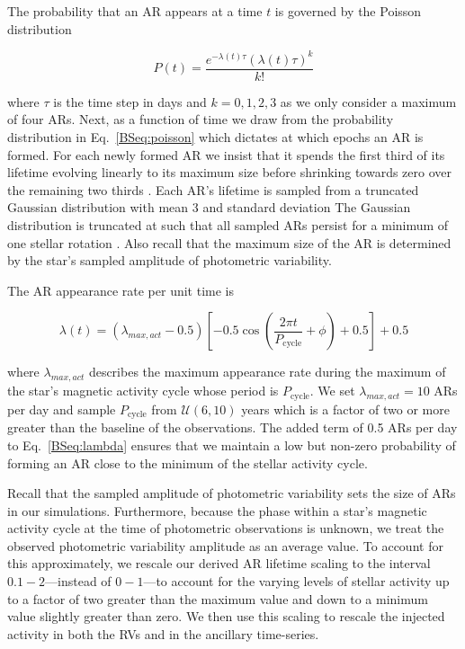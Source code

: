 The probability that an AR appears at a time $t$ is governed by the Poisson distribution

\begin{equation}
  P(t) = \frac{e^{-\lambda(t) \tau} (\lambda(t) \tau)^k}{k!} \label{BSeq:poisson}
\end{equation}

\noindent where $\tau$ is the time step in days and $k=0,1,2,3$ as we only consider a maximum of
four ARs. Next, as a function of time we draw from the probability distribution in Eq.~\ref{BSeq:poisson} 
which dictates at which epochs an AR is formed. For each newly formed AR 
we insist that it spends the first third of its lifetime evolving linearly to its maximum size before
shrinking towards zero over the remaining two thirds \citep{dumusque16a}.
Each AR's lifetime is sampled from a truncated Gaussian distribution with mean 3\prot{} and standard
deviation  The Gaussian distribution is truncated at \prot{} such that all sampled ARs persist
for a minimum of one stellar rotation \citep[e.g.][]{bonfils07,forveille09,hebrard16}.
Also recall that the maximum size of the AR is determined by the star's sampled amplitude of photometric
variability.

The AR appearance rate per unit time is

\begin{equation}
  \lambda(t) = (\lambda_{max,act} - 0.5) \left[ -0.5 \cos{\left( \frac{2\pi t}{P_{\text{cycle}}} + \phi \right)} + 0.5 \right] + 0.5
\label{BSeq:lambda}
\end{equation}

\noindent where $\lambda_{max,act}$ describes the maximum appearance rate during the maximum of the star's
magnetic activity cycle whose period is $P_{\text{cycle}}$. We set $\lambda_{max,act}=10$ ARs per day and sample
$P_{\text{cycle}}$ from $\mathcal{U}(6,10)$ years \citep{mascareno16, wargelin17} which is a factor of two or more
greater than the baseline of the observations. The added term of 0.5 ARs per day
to Eq.~\ref{BSeq:lambda} ensures that we maintain a low but non-zero probability of forming an AR close to the
minimum of the stellar activity cycle.

Recall that the sampled amplitude of photometric variability sets the size of ARs in our simulations.
Furthermore, because the phase within a star's magnetic activity cycle at the time of photometric observations
is unknown, we treat the observed photometric variability amplitude as an average value. To account for this
approximately, we rescale our
derived AR lifetime scaling to the interval $0.1-2$---instead of $0-1$---to account for the varying levels of
stellar activity up to a factor of two greater than the maximum value and down to a minimum value slightly greater
than zero. We then use this scaling to rescale the injected activity in both the RVs and in the ancillary time-series.

